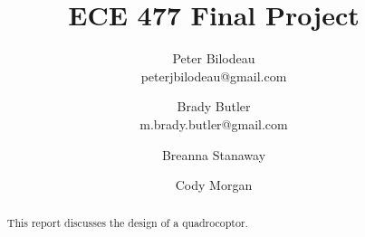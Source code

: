 \documentclass[12pt]{article}
\author{Peter Bilodeau\\
	peterjbilodeau@gmail.com\and
	Brady Butler\\
	m.brady.butler@gmail.com\and
	Breanna Stanaway\and
	Cody Morgan\\
	}
\title{ECE 477 Final Project}
\begin{document}
\maketitle

\begin{abstract}

This report discusses the design of a quadrocoptor. 

\end{abstract}
\clearpage

\clearpage

\tableofcontents

\clearpage




\clearpage


\clearpage


\clearpage


\clearpage


\clearpage


\clearpage


\clearpage


\clearpage


\clearpage


\clearpage


\clearpage


\clearpage


\clearpage


\clearpage


\clearpage



\clearpage
\appendix


\end{document}
